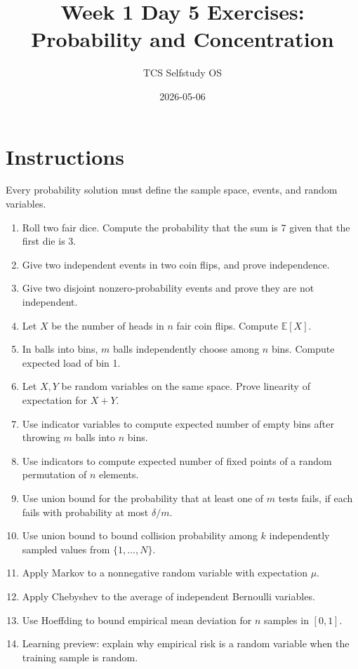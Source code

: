 \documentclass[11pt]{article}
\title{Week 1 Day 5 Exercises: Probability and Concentration}
\author{TCS Selfstudy OS}
\date{2026-05-06}
\begin{document}
\maketitle

\section*{Instructions}
Every probability solution must define the sample space, events, and random variables.

\begin{enumerate}[label=\textbf{D5.\arabic*.}]
\item Roll two fair dice. Compute the probability that the sum is 7 given that the first die is 3.
\item Give two independent events in two coin flips, and prove independence.
\item Give two disjoint nonzero-probability events and prove they are not independent.
\item Let $X$ be the number of heads in $n$ fair coin flips. Compute $\mathbb{E}[X]$.
\item In balls into bins, $m$ balls independently choose among $n$ bins. Compute expected load of bin 1.
\item Let $X,Y$ be random variables on the same space. Prove linearity of expectation for $X+Y$.
\item Use indicator variables to compute expected number of empty bins after throwing $m$ balls into $n$ bins.
\item Use indicators to compute expected number of fixed points of a random permutation of $n$ elements.
\item Use union bound for the probability that at least one of $m$ tests fails, if each fails with probability at most $\delta/m$.
\item Use union bound to bound collision probability among $k$ independently sampled values from $\{1,\dots,N\}$.
\item Apply Markov to a nonnegative random variable with expectation $\mu$.
\item Apply Chebyshev to the average of independent Bernoulli variables.
\item Use Hoeffding to bound empirical mean deviation for $n$ samples in $[0,1]$.
\item Learning preview: explain why empirical risk is a random variable when the training sample is random.
\end{enumerate}
\end{document}
